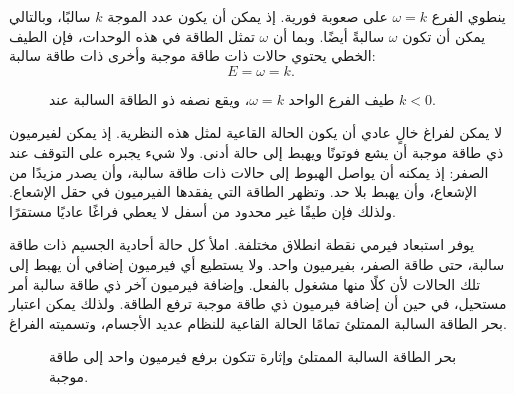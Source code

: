ينطوي الفرع \(\omega=k\) على صعوبة فورية. إذ يمكن أن يكون عدد الموجة \(k\) سالبًا، وبالتالي يمكن أن تكون \(\omega\) سالبةً أيضًا. وبما أن \(\omega\) تمثل الطاقة في هذه الوحدات، فإن الطيف الخطي يحتوي حالات ذات طاقة موجبة وأخرى ذات طاقة سالبة:
\begin{equation}
E=\omega=k.
\end{equation}

\begin{figure}
\centering
{}
\caption{طيف الفرع الواحد \(\omega=k\)، ويقع نصفه ذو الطاقة السالبة عند \(k<0\).}
\end{figure}

لا يمكن لفراغ خالٍ عادي أن يكون الحالة القاعية لمثل هذه النظرية. إذ يمكن لفيرميون ذي طاقة موجبة أن يشع فوتونًا ويهبط إلى حالة أدنى. ولا شيء يجبره على التوقف عند الصفر: إذ يمكنه أن يواصل الهبوط إلى حالات ذات طاقة سالبة، وأن يصدر مزيدًا من الإشعاع، وأن يهبط بلا حد. وتظهر الطاقة التي يفقدها الفيرميون في حقل الإشعاع. ولذلك فإن طيفًا غير محدود من أسفل لا يعطي فراغًا عاديًا مستقرًا.

يوفر استبعاد فيرمي نقطة انطلاق مختلفة. املأ كل حالة أحادية الجسيم ذات طاقة سالبة، حتى طاقة الصفر، بفيرميون واحد. ولا يستطيع أي فيرميون إضافي أن يهبط إلى تلك الحالات لأن كلًا منها مشغول بالفعل. وإضافة فيرميون آخر ذي طاقة سالبة أمر مستحيل، في حين أن إضافة فيرميون ذي طاقة موجبة ترفع الطاقة. ولذلك يمكن اعتبار بحر الطاقة السالبة الممتلئ تمامًا الحالة القاعية للنظام عديد الأجسام، وتسميته الفراغ.

\begin{figure}
\centering
{}
\caption{بحر الطاقة السالبة الممتلئ وإثارة تتكون برفع فيرميون واحد إلى طاقة موجبة.}
\end{figure}

